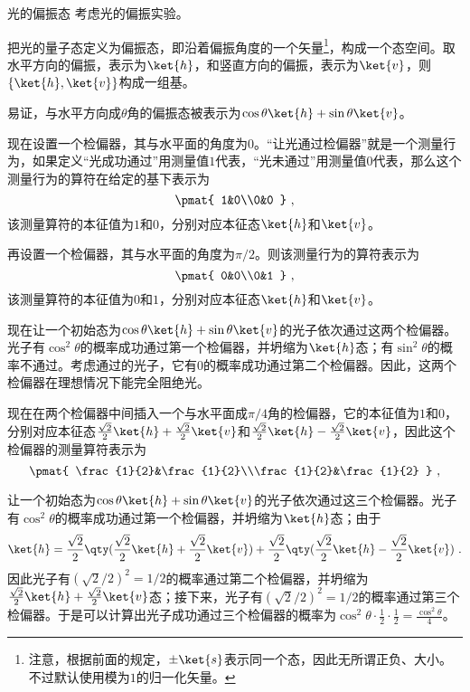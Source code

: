 \begin{example}{光的偏振态}\label{ex_QMPrcp_3}
考虑光的偏振实验。

把光的量子态定义为偏振态，即沿着偏振角度的一个矢量\footnote{注意，根据前面的规定，$\pm\ket{s}$表示同一个态，因此无所谓正负、大小。不过默认使用模为$1$的归一化矢量。}，构成一个态空间。取水平方向的偏振，表示为$\ket{h}$，和竖直方向的偏振，表示为$\ket{v}$，则$\{\ket{h}, \ket{v}\}$构成一组基。

易证，与水平方向成$\theta$角的偏振态被表示为$\cos\theta\ket{h}+\sin\theta\ket{v}$。

现在设置一个检偏器，其与水平面的角度为$0$。“让光通过检偏器”就是一个测量行为，如果定义“光成功通过”用测量值$1$代表，“光未通过”用测量值$0$代表，那么这个测量行为的算符在给定的基下表示为
\begin{equation}
\pmat{
    1&0\\0&0
}~,
\end{equation}
该测量算符的本征值为$1$和$0$，分别对应本征态$\ket{h}$和$\ket{v}$。

再设置一个检偏器，其与水平面的角度为$\pi/2$。则该测量行为的算符表示为
\begin{equation}
\pmat{
    0&0\\0&1
}~,
\end{equation}
该测量算符的本征值为$0$和$1$，分别对应本征态$\ket{h}$和$\ket{v}$。

现在让一个初始态为$\cos\theta\ket{h}+\sin\theta\ket{v}$的光子依次通过这两个检偏器。光子有$\cos^2\theta$的概率成功通过第一个检偏器，并坍缩为$\ket{h}$态；有$\sin^2\theta$的概率不通过。考虑通过的光子，它有$0$的概率成功通过第二个检偏器。因此，这两个检偏器在理想情况下能完全阻绝光。

现在在两个检偏器中间插入一个与水平面成$\pi/4$角的检偏器，它的本征值为$1$和$0$，分别对应本征态$\frac{\sqrt{2}}{2}\ket{h}+\frac{\sqrt{2}}{2}\ket{v}$和$\frac{\sqrt{2}}{2}\ket{h}-\frac{\sqrt{2}}{2}\ket{v}$，因此这个检偏器的测量算符表示为
\begin{equation}
\pmat{
    \frac{1}{2}&\frac{1}{2}\\\frac{1}{2}&\frac{1}{2}
}~,
\end{equation}

让一个初始态为$\cos\theta\ket{h}+\sin\theta\ket{v}$的光子依次通过这三个检偏器。光子有$\cos^2\theta$的概率成功通过第一个检偏器，并坍缩为$\ket{h}$态；由于
\begin{equation}
\ket{h}=\frac{\sqrt{2}}{2}\qty(\frac{\sqrt{2}}{2}\ket{h}+\frac{\sqrt{2}}{2}\ket{v})+\frac{\sqrt{2}}{2}\qty(\frac{\sqrt{2}}{2}\ket{h}-\frac{\sqrt{2}}{2}\ket{v})~.
\end{equation}
因此光子有$(\sqrt{2}/2)^2=1/2$的概率通过第二个检偏器，并坍缩为$\frac{\sqrt{2}}{2}\ket{h}+\frac{\sqrt{2}}{2}\ket{v}$态；接下来，光子有$(\sqrt{2}/2)^2=1/2$的概率通过第三个检偏器。于是可以计算出光子成功通过三个检偏器的概率为$\cos^2\theta\cdot\frac{1}{2}\cdot\frac{1}{2}=\frac{\cos^2\theta}{4}$。

\end{example}



